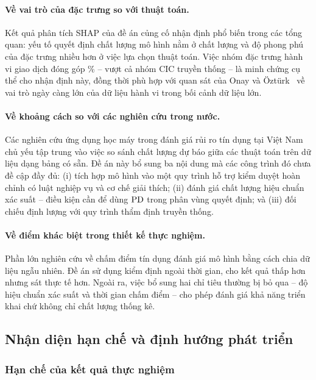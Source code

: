 \paragraph{Về vai trò của đặc trưng so với thuật toán.} Kết quả phân tích SHAP
của đề án củng cố nhận định phổ biến trong các tổng quan: yếu tố quyết định chất
lượng mô hình nằm ở chất lượng và độ phong phú của đặc trưng nhiều hơn ở việc lựa
chọn thuật toán. Việc nhóm đặc trưng hành vi giao dịch đóng góp \ShapBehaviourPct{}\%
-- vượt cả nhóm CIC truyền thống -- là minh chứng cụ thể cho nhận định này, đồng
thời phù hợp với quan sát của Onay và Öztürk~\cite{onay2018} về vai trò ngày càng
lớn của dữ liệu hành vi trong bối cảnh dữ liệu lớn.

\paragraph{Về khoảng cách so với các nghiên cứu trong nước.} Các nghiên cứu ứng
dụng học máy trong đánh giá rủi ro tín dụng tại Việt Nam~\cite{thu2025,thao2025}
chủ yếu tập trung vào việc so sánh chất lượng dự báo giữa các thuật toán trên dữ
liệu dạng bảng có sẵn. Đề án này bổ sung ba nội dung mà các công trình đó chưa đề
cập đầy đủ: (i) tích hợp mô hình vào một quy trình hỗ trợ kiểm duyệt hoàn chỉnh có
luật nghiệp vụ và cơ chế giải thích; (ii) đánh giá chất lượng hiệu chuẩn xác suất
-- điều kiện cần để dùng $\mathrm{PD}$ trong phân vùng quyết định; và (iii) đối chiếu
định lượng với quy trình thẩm định truyền thống.

\paragraph{Về điểm khác biệt trong thiết kế thực nghiệm.} Phần lớn nghiên cứu về
chấm điểm tín dụng đánh giá mô hình bằng cách chia dữ liệu ngẫu nhiên. Đề án sử
dụng kiểm định ngoài thời gian, cho kết quả thấp hơn nhưng sát thực tế hơn. Ngoài
ra, việc bổ sung hai chỉ tiêu thường bị bỏ qua -- độ hiệu chuẩn xác suất và thời
gian chấm điểm -- cho phép đánh giá khả năng triển khai chứ không chỉ chất lượng
thống kê.

\subsection{Nhận diện hạn chế và định hướng phát triển}
\label{subsec:han-che-dinh-huong}

\subsubsection{Hạn chế của kết quả thực nghiệm}


